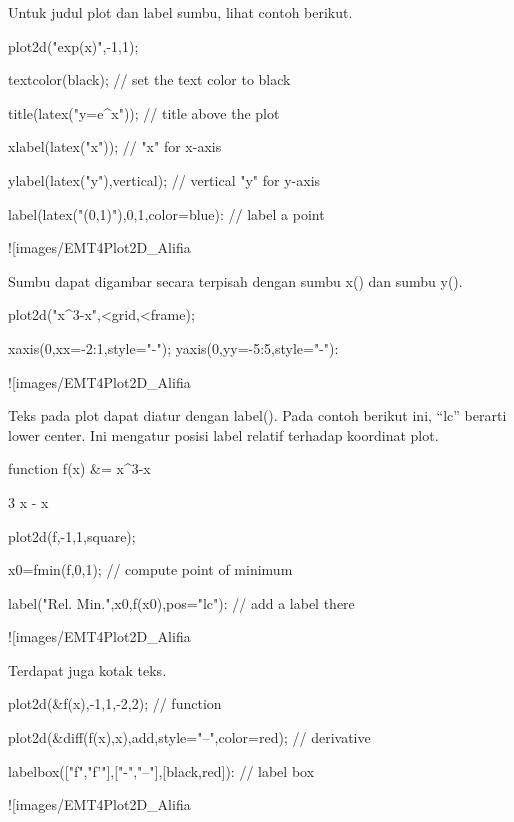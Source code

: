\documentclass{article}
\begin{document}
Untuk judul plot dan label sumbu, lihat contoh berikut.


\>plot2d("exp(x)",-1,1);

\>textcolor(black); // set the text color to black

\>title(latex("y=e^x")); // title above the plot

\>xlabel(latex("x")); // "x" for x-axis

\>ylabel(latex("y"),\>vertical); // vertical "y" for y-axis

\>label(latex("(0,1)"),0,1,color=blue): // label a point


![images/EMT4Plot2D_Alifia%

Sumbu dapat digambar secara terpisah dengan sumbu x() dan sumbu y().


\>plot2d("x^3-x",<grid,<frame);

\>xaxis(0,xx=-2:1,style="-\>"); yaxis(0,yy=-5:5,style="-\>"):


![images/EMT4Plot2D_Alifia%

Teks pada plot dapat diatur dengan label(). Pada contoh berikut ini,
“lc” berarti lower center. Ini mengatur posisi label relatif terhadap
koordinat plot.


\>function f(x) &= x^3-x


    
                                     3
                                    x  - x
    

\>plot2d(f,-1,1,\>square);

\>x0=fmin(f,0,1); // compute point of minimum

\>label("Rel. Min.",x0,f(x0),pos="lc"): // add a label there


![images/EMT4Plot2D_Alifia%

Terdapat juga kotak teks.


\>plot2d(&f(x),-1,1,-2,2); // function

\>plot2d(&diff(f(x),x),\>add,style="--",color=red); // derivative

\>labelbox(["f","f'"],["-","--"],[black,red]): // label box


![images/EMT4Plot2D_Alifia%
\end{document}
